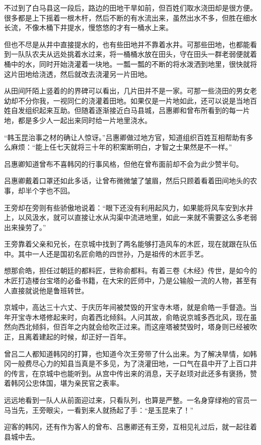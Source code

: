 不过到了白马县这一段后，路边的田地干旱如前，但百姓们取水浇田却是很方便。很多都是上下摇着一根木杆，然后不断的有水流出来，虽然出水不多，但胜在细水长流，不像木桶下井提水，慢悠悠的才有一桶水上来。

但也不尽是从井中直接提水的，也有些田地并不靠着水井。可那些田地，也都能看到一队队农夫从远处挑着水过来，将一桶桶水放在田头，守在田头一群老弱便就着桶中的水，同时开始浇灌着一块地。一瓢一瓢的不断的将水泼洒到地里，很快就将这片田地给浇透，然后就改去浇灌另一片田地。

从田间阡陌上竖着的的界碑可以看出，几片田并不是一家。可那一些浇田的男女老幼却不分你我，一视同仁的浇灌着田地。如果仅是一片地如此，还可以说是当地百姓自发组织起来互助。但随着逐渐接近白马县城，吕惠卿和曾布所看到的每一片地，都是多少人一起出来同时给一片地里浇水。

“韩玉昆治事之材的确让人惊讶。”吕惠卿做过地方官，知道组织百姓互相帮助有多么麻烦：“能上任七天就将三十年的积案断明白，才智之士果然是不一样。”

吕惠卿知道曾布不喜韩冈的行事风格，但他在曾布面前却不会为此少赞半句。

吕惠卿戴着口罩还如此多话，让曾布微微皱了皱眉，然后只顾着看着田间地头的农事，却半个字也不回。

王旁却在旁则有些骄傲地说着：“眼下还没有利用起风力，如果能将风车安到水井上，以风汲水，就可以直接让水从沟渠中流进地里，如此一来就不需要这么多老弱出来操劳了。”

王旁靠着父亲和兄长，在京城中找到了两名能够打造风车的木匠，现在就跟在队伍中。其中一人还是国初名匠俞皓的四世孙，乃是祖传的木匠手艺。

想那俞皓，担任过朝廷的都料匠，世称俞都料。有着三卷《木经》传世，是如今的木匠打造楼台宝塔的必备书籍，在大宋的匠师中，乃是公输般一流的人物，甚至有人直接就说他是鲁班转世。

京城中，高达三十六丈、于庆历年间被焚毁的开宝寺木塔，就是俞皓一手督造。当年开宝寺木塔修起来时，向着西北倾斜。人问其故，俞皓说京城多西北风，现在虽然向西北倾斜，但百年之内就会给吹正过来。而这座塔被焚毁时，塔身则已经被吹正，且离着建起的时候，却正好一百年。

曾吕二人都知道韩冈的打算，也知道今次王旁带了什么出来。为了解决旱情，如韩冈一般费尽心力的知县当真是不多见，为了浇灌田地，一口气在县中开了上百口井的传言，在京城中也能听到。从宫中传出来的消息，天子赵顼对此还多有褒扬，赞着韩冈公忠体国，堪为亲民官之表率。

远远地看到一队人从前面迎过来，只看队列，也算是严整。一名身穿绿袍的官员一马当先，王旁眼尖，一看到来人就扬起了手：“是玉昆来了！”

迎客的韩冈，还有作为客人的曾布、吕惠卿还有王旁，互相见礼过后，就一起往着县城中去。

